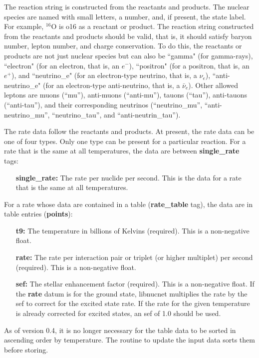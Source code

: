 \documentclass{article}    %
\begin{document}
The reaction string is constructed from the reactants and products.
The nuclear species are named with small letters, a number, and, if
present, the state label.  For example, $^{16}$O is o16 as a
reactant or product. The reaction string constructed from the
reactants and products should be valid, that is, it should satisfy
baryon number, lepton number, and charge conservation.  To do this,
the reactants or products are not just nuclear species but can also
be ``gamma" (for gamma-rays), ``electron" (for an electron, that is,
an $e^-$), ``positron" (for a positron, that is, an $e^+$), and
``neutrino\_e" (for an electron-type neutrino, that is, a $\nu_e$),
``anti-neutrino\_e" (for an electron-type anti-neutrino, that is, a
${\bar \nu}_e$).  Other allowed leptons are muons (``mu''), anti-muons
(``anti-mu''), tauons (``tau''), anti-tauons (``anti-tau''), and their
corresponding neutrinos (``neutrino\_mu'', ``anti-neutrino\_mu'',
``neutrino\_tau'', and ``anti-neutrin\_tau'').

The rate data follow the reactants and products.  At present, the
rate data can be one of four types.  Only one type can be present
for a particular reaction.  For a rate that is the same at all
temperatures, the data are between {\bf single\_rate} tags:

\begin{itemize}

\item[{\bf single\_rate:}] The rate per nuclide per second.  This is
the data for a rate that is the same at all temperatures.

\end{itemize}

For a rate whose data are contained in a table ({\bf rate\_table}
tag), the data are in table entries ({\bf points}):

\begin{itemize}

\item[{\bf t9:}] The temperature in billions of Kelvins (required).
This is a non-negative float.

\item[{\bf rate:}] The rate per interaction pair or triplet (or
higher multiplet) per second (required).  This is a non-negative
float.

\item[{\bf sef:}] The stellar enhancement factor (required).  This is
a non-negative float.  If the {\bf rate} datum is for the ground state,
libnucnet multiplies the rate by the sef to correct for the excited
state rate.  If the rate for the given temperature is already
corrected for excited states, an sef of 1.0 should be used.

\end{itemize}
As of version 0.4, it is no longer necessary for the table data to be sorted
in ascending order by temperature.  The routine to update the input data sorts
them before storing.
\end{document}

